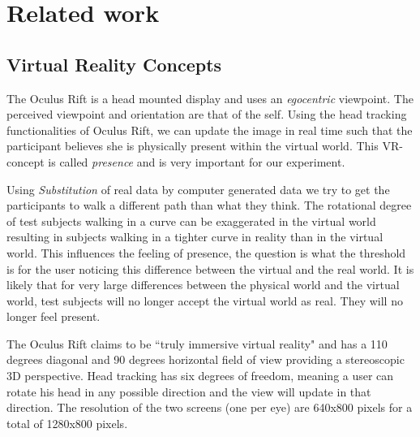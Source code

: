 \section{Related work}


\subsection{Virtual Reality Concepts}\label{sec:concepts}
The Oculus Rift is a head mounted display and uses an \textit{egocentric} viewpoint. 
The perceived viewpoint and orientation are that of the self.
Using the head tracking functionalities of Oculus Rift, we can update the image in real time such that the participant believes she is physically present within the virtual world.
This VR-concept is called \textit{presence} and is very important for our experiment.

Using \textit{Substitution} of real data by computer generated data we try to get the participants to walk a different path than what they think. 
The rotational degree of test subjects walking in a curve can be exaggerated in the virtual world resulting in subjects walking in a tighter curve in reality than in the virtual world.
This influences the feeling of presence, the question is what the threshold is for the user noticing this difference between the virtual and the real world. 
It is likely that for very large differences between the physical world and the virtual world, test subjects will no longer accept the virtual world as real.
They will no longer feel present. 

The Oculus Rift claims to be ``truly immersive virtual reality" and has a 110 degrees diagonal and 90 degrees horizontal field of view providing a stereoscopic 3D perspective.
Head tracking has six degrees of freedom, meaning a user can rotate his head in any possible direction and the view will update in that direction.
The resolution of the two screens (one per eye) are 640x800 pixels for a total of 1280x800 pixels.

